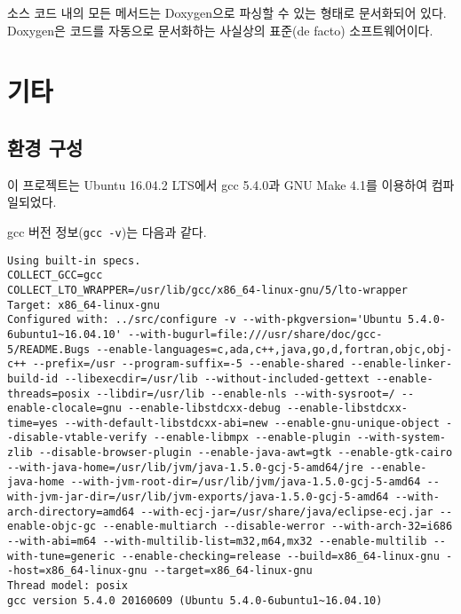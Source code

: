 \documentclass[runningheads]{llncs}
\begin{document}
소스 코드 내의 모든 메서드는 Doxygen으로 파싱할 수 있는 형태로 문서화되어 있다. Doxygen은 코드를 자동으로 문서화하는 사실상의 표준(de facto) 소프트웨어이다\cite{doxygen}.

%
%
%

\section{기타}

\subsection{환경 구성}
이 프로젝트는 Ubuntu 16.04.2 LTS에서 gcc 5.4.0과 GNU Make 4.1를 이용하여 컴파일되었다.

gcc 버전 정보(\texttt{gcc -v})는 다음과 같다.
\begin{lstlisting}[breaklines]
Using built-in specs.
COLLECT_GCC=gcc
COLLECT_LTO_WRAPPER=/usr/lib/gcc/x86_64-linux-gnu/5/lto-wrapper
Target: x86_64-linux-gnu
Configured with: ../src/configure -v --with-pkgversion='Ubuntu 5.4.0-6ubuntu1~16.04.10' --with-bugurl=file:///usr/share/doc/gcc-5/README.Bugs --enable-languages=c,ada,c++,java,go,d,fortran,objc,obj-c++ --prefix=/usr --program-suffix=-5 --enable-shared --enable-linker-build-id --libexecdir=/usr/lib --without-included-gettext --enable-threads=posix --libdir=/usr/lib --enable-nls --with-sysroot=/ --enable-clocale=gnu --enable-libstdcxx-debug --enable-libstdcxx-time=yes --with-default-libstdcxx-abi=new --enable-gnu-unique-object --disable-vtable-verify --enable-libmpx --enable-plugin --with-system-zlib --disable-browser-plugin --enable-java-awt=gtk --enable-gtk-cairo --with-java-home=/usr/lib/jvm/java-1.5.0-gcj-5-amd64/jre --enable-java-home --with-jvm-root-dir=/usr/lib/jvm/java-1.5.0-gcj-5-amd64 --with-jvm-jar-dir=/usr/lib/jvm-exports/java-1.5.0-gcj-5-amd64 --with-arch-directory=amd64 --with-ecj-jar=/usr/share/java/eclipse-ecj.jar --enable-objc-gc --enable-multiarch --disable-werror --with-arch-32=i686 --with-abi=m64 --with-multilib-list=m32,m64,mx32 --enable-multilib --with-tune=generic --enable-checking=release --build=x86_64-linux-gnu --host=x86_64-linux-gnu --target=x86_64-linux-gnu
Thread model: posix
gcc version 5.4.0 20160609 (Ubuntu 5.4.0-6ubuntu1~16.04.10)
\end{lstlisting}
\end{document}
